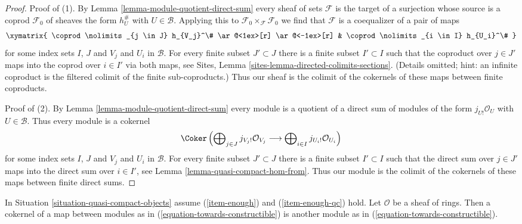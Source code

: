 \begin{proof}
Proof of (1). By Lemma \ref{lemma-module-quotient-direct-sum}
every sheaf of sets $\mathcal{F}$ is the target of a surjection
whose source is a coprod $\mathcal{F}_0$
of sheaves the form $h_{U}^\#$ with $U \in \mathcal{B}$.
Applying this to $\mathcal{F}_0 \times_\mathcal{F} \mathcal{F}_0$
we find that $\mathcal{F}$ is a coequalizer of a pair of maps
$$
\xymatrix{
\coprod\nolimits_{j \in J} h_{V_j}^\#
\ar@<1ex>[r] \ar@<-1ex>[r] &
\coprod\nolimits_{i \in I} h_{U_i}^\#
}
$$
for some index sets $I$, $J$ and $V_j$ and $U_i$ in $\mathcal{B}$.
For every finite subset $J' \subset J$ there is a finite subset
$I' \subset I$ such that the coproduct over $j \in J'$ maps into
the coprod over $i \in I'$ via both maps, see
Sites, Lemma \ref{sites-lemma-directed-colimits-sections}.
(Details omitted; hint: an infinite coproduct is the filtered colimit
of the finite sub-coproducts.)
Thus our sheaf is the colimit of the cokernels of these maps
between finite coproducts.

\medskip\noindent
Proof of (2).
By Lemma \ref{lemma-module-quotient-direct-sum}
every module is a quotient of a direct sum of modules of the form
$j_{U!}\mathcal{O}_U$ with $U \in \mathcal{B}$. Thus every module
is a cokernel
$$
\Coker\left(
\bigoplus\nolimits_{j \in J} j_{V_j!}\mathcal{O}_{V_j}
\longrightarrow
\bigoplus\nolimits_{i \in I} j_{U_i!}\mathcal{O}_{U_i}
\right)
$$
for some index sets $I$, $J$ and $V_j$ and $U_i$ in $\mathcal{B}$.
For every finite subset $J' \subset J$ there is a finite subset
$I' \subset I$ such that the direct sum over $j \in J'$ maps into
the direct sum over $i \in I'$, see
Lemma \ref{lemma-quasi-compact-hom-from}.
Thus our module is the colimit of the cokernels of these maps
between finite direct sums.
\end{proof}

\begin{lemma}
\label{lemma-cokernel-map-towards-constructibles}
In Situation \ref{situation-quasi-compact-objects} assume
(\ref{item-enough}) and (\ref{item-enough-qc}) hold.
Let $\mathcal{O}$ be a sheaf of rings.
Then a cokernel of a map between modules as in
(\ref{equation-towards-constructible}) is another module as
in (\ref{equation-towards-constructible}).
\end{lemma}

